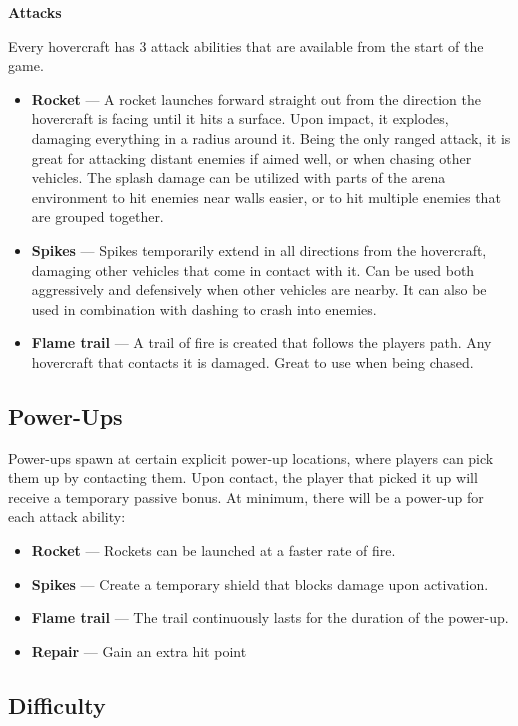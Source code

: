 \documentclass{article}
\theoremstyle{definition}
\begin{document}
\textbf{Attacks}

Every hovercraft has 3 attack abilities that are available from the start of
the game.

\begin{itemize}
  \item \textbf{Rocket} --- A rocket launches forward straight out from the
    direction the hovercraft is facing until it hits a surface. Upon impact, it
    explodes, damaging everything in a radius around it. Being the only ranged
    attack, it is great for attacking distant enemies if aimed well, or when
    chasing other vehicles. The splash damage can be utilized with parts of the
    arena environment to hit enemies near walls easier, or to hit multiple
    enemies that are grouped together.
  \item \textbf{Spikes} --- Spikes temporarily extend in all directions from
    the hovercraft, damaging other vehicles that come in contact with it. Can
    be used both aggressively and defensively when other vehicles are nearby.
    It can also be used in combination with dashing to crash into enemies.
  \item \textbf{Flame trail} --- A trail of fire is created that follows the
    players path. Any hovercraft that contacts it is damaged. Great to use when
    being chased.
\end{itemize}


\subsection{Power-Ups}

Power-ups spawn at certain explicit power-up locations, where players can pick
them up by contacting them. Upon contact, the player that picked it up will
receive a temporary passive bonus. At minimum, there will be a power-up for
each attack ability:
\begin{itemize}
  \item \textbf{Rocket} --- Rockets can be launched at a faster rate of fire.
  \item \textbf{Spikes} --- Create a temporary shield that blocks damage upon
    activation.
  \item \textbf{Flame trail} --- The trail continuously lasts for the duration
    of the power-up.
  \item \textbf{Repair} --- Gain an extra hit point
\end{itemize}

\subsection{Difficulty}
\end{document}
